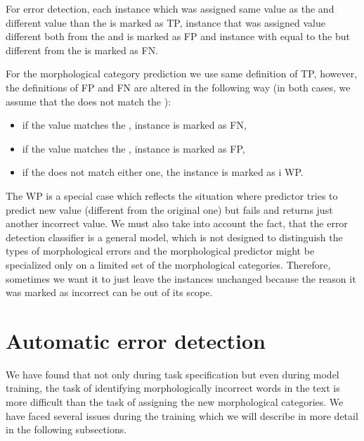 For error detection, each instance which was assigned same value as the 
and different value than the  is marked as TP, instance
that was assigned value different both from the  and 
is marked as FP and instance with  equal to the 
but different from the  is marked as FN.

For the morphological category prediction we use same definition of TP, however, the definitions
of FP and FN are altered in the following way (in both cases, we assume that the 
does not match the ):
\begin{itemize}
\item if the  value matches the , instance is marked as FN,
\item if the  value matches the , instance is marked as FP,
\item if the  does not match either one, the instance is marked as i WP.
\end{itemize}

The WP is a special case which reflects the situation where predictor tries to predict new value (different
from the original one) but fails and returns just another incorrect value. We must also take into account
the fact, that the error detection classifier is a general model, which is not designed to distinguish
the types of morphological errors and the morphological predictor might be specialized only on a limited
set of the morphological categories. Therefore, sometimes we want it to just leave the 
instances unchanged because the reason it was marked as incorrect can be out of its scope.

\section{Automatic error detection}


We have found that not only during task specification but even during model training,
the task of identifying morphologically incorrect words in the text is more difficult
than the task of assigning the new morphological categories. We have faced several issues
during the training which we will describe in more detail in the following subsections.



